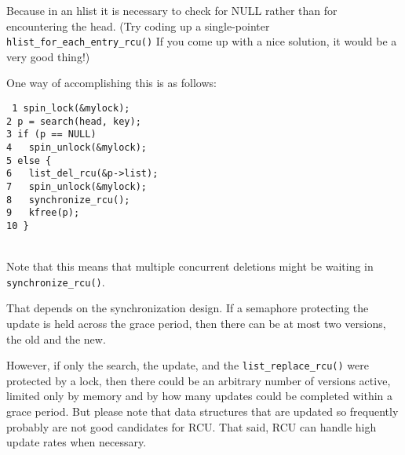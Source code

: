 
Because in an hlist it is necessary to check for
NULL rather than for encountering the head.
(Try coding up a single-pointer {\tt hlist\_for\_each\_entry\_rcu()}
If you come up with a nice solution, it would be a very good thing!)


One way of accomplishing this is as follows:
\\
\vspace{5pt}
\begin{minipage}[t]{\columnwidth}
{\tt
  1 spin\_lock(\&mylock);\\
  2 p = search(head, key);\\
  3 if (p == NULL)\\
  4 ~~spin\_unlock(\&mylock);\\
  5 else \{\\
  6 ~~list\_del\_rcu(\&p->list);\\
  7 ~~spin\_unlock(\&mylock);\\
  8 ~~synchronize\_rcu();\\
  9 ~~kfree(p);\\
 10 \}\\
}
\end{minipage}
\vspace{5pt}
\\
Note that this means that multiple concurrent deletions might be
waiting in {\tt synchronize\_rcu()}.


That depends on the synchronization design.
If a semaphore protecting the update is held across the grace period,
then there can be at most two versions, the old and the new.

However, if only the search, the update, and the
{\tt list\_replace\_rcu()} were protected by a lock, then
there could be an arbitrary number of versions active, limited only
by memory and by how many updates could be completed within a
grace period.
But please note that data structures that are updated so frequently
probably are not good candidates for RCU.
That said, RCU can handle high update rates when necessary.


